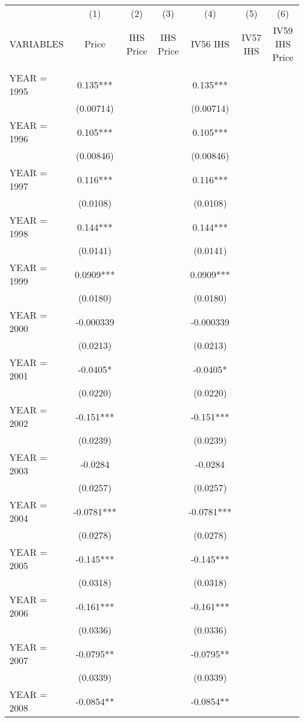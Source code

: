 \begin{tabular}{lcccccc} \hline
 & (1) & (2) & (3) & (4) & (5) & (6) \\
VARIABLES & Price & IHS Price & IHS Price & IV56 IHS & IV57 IHS & IV59 IHS Price \\ \hline
 &  &  &  &  &  &  \\
YEAR = 1995 & 0.135*** &  &  & 0.135*** &  &  \\
 & (0.00714) &  &  & (0.00714) &  &  \\
YEAR = 1996 & 0.105*** &  &  & 0.105*** &  &  \\
 & (0.00846) &  &  & (0.00846) &  &  \\
YEAR = 1997 & 0.116*** &  &  & 0.116*** &  &  \\
 & (0.0108) &  &  & (0.0108) &  &  \\
YEAR = 1998 & 0.144*** &  &  & 0.144*** &  &  \\
 & (0.0141) &  &  & (0.0141) &  &  \\
YEAR = 1999 & 0.0909*** &  &  & 0.0909*** &  &  \\
 & (0.0180) &  &  & (0.0180) &  &  \\
YEAR = 2000 & -0.000339 &  &  & -0.000339 &  &  \\
 & (0.0213) &  &  & (0.0213) &  &  \\
YEAR = 2001 & -0.0405* &  &  & -0.0405* &  &  \\
 & (0.0220) &  &  & (0.0220) &  &  \\
YEAR = 2002 & -0.151*** &  &  & -0.151*** &  &  \\
 & (0.0239) &  &  & (0.0239) &  &  \\
YEAR = 2003 & -0.0284 &  &  & -0.0284 &  &  \\
 & (0.0257) &  &  & (0.0257) &  &  \\
YEAR = 2004 & -0.0781*** &  &  & -0.0781*** &  &  \\
 & (0.0278) &  &  & (0.0278) &  &  \\
YEAR = 2005 & -0.145*** &  &  & -0.145*** &  &  \\
 & (0.0318) &  &  & (0.0318) &  &  \\
YEAR = 2006 & -0.161*** &  &  & -0.161*** &  &  \\
 & (0.0336) &  &  & (0.0336) &  &  \\
YEAR = 2007 & -0.0795** &  &  & -0.0795** &  &  \\
 & (0.0339) &  &  & (0.0339) &  &  \\
YEAR = 2008 & -0.0854** &  &  & -0.0854** &  &  \\

\end{tabular}
